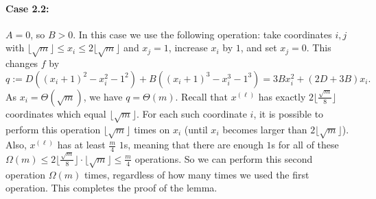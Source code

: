 \documentclass[11pt]{article}
\let\oldendproof\endproof
\renewenvironment{proof}[1][\proofname]{%
	\oldproof[\bf #1]%
}{\oldendproof}
\theoremstyle{plain}
\newtheorem{lemma}[theorem]{Lemma}
\begin{document}
\begin{proof}[Proof of Lemma \ref{general-values-lemma}]
    \paragraph{Case 2.2:} $A = 0$, so $B > 0$.
    In this case we use the following operation: take coordinates $i,j$ with  
    $\lfloor \sqrt{m} \rfloor \leq x_i \leq 2 \lfloor \sqrt{m} \rfloor$ and $x_j = 1$, increase $x_i$ by $1$, and set $x_j = 0$. This changes $f$ by 
    $$q := D((x_i+1)^2 - x_i^2 - 1^2) + B((x_i+1)^3 - x_i^3 - 1^3) = 
    3Bx_i^2 + (2D+3B)x_i.
    $$
    As $x_i = \Theta(\sqrt{m})$, we have $q = \Theta(m)$. 
    Recall that $x^{(\ell)}$ has exactly $2 \lfloor \frac{\sqrt{m}}{8} \rfloor$ coordinates which equal $\lfloor \sqrt{m} \rfloor$. For each such coordinate $i$, it is possible to perform this operation $\lfloor \sqrt{m} \rfloor$ times on $x_i$ (until $x_i$ becomes larger than $2 \lfloor \sqrt{m} \rfloor$). Also, $x^{(\ell)}$ has at least $\frac{m}{4}$ $1$s, meaning that there are enough $1$s for all of these $\Omega(m) \leq 2 \lfloor \frac{\sqrt{m}}{8} \rfloor \cdot \lfloor \sqrt{m} \rfloor \leq \frac{m}{4}$ operations. 
    So we can perform this second operation $\Omega(m)$ times, regardless of how many times we used the first operation.
    This completes the proof of the lemma. 
\end{proof}

\end{document}
